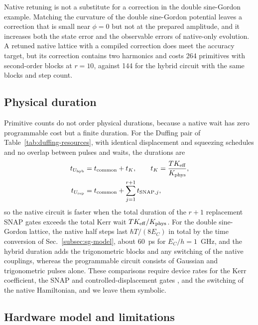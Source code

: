 \documentclass[pra,twocolumn,superscriptaddress,nofootinbib,floatfix]{revtex4-2}
\theoremstyle{remark}
\begin{document}
Native retuning is not a substitute for a correction in the double sine-Gordon example. Matching the curvature of the double sine-Gordon potential leaves a correction that is small near \(\phi=0\) but not at the prepared amplitude, and it increases both the state error and the observable errors of native-only evolution. A retuned native lattice with a compiled correction does meet the accuracy target, but its correction contains two harmonics and costs 264 primitives with second-order blocks at \(r=10\), against 144 for the hybrid circuit with the same blocks and step count.

\subsection{Physical duration}
\label{subsec:duration}

Primitive counts do not order physical durations, because a native wait has zero programmable cost but a finite duration. For the Duffing pair of Table~\ref{tab:duffing-resources}, with identical displacement and squeezing schedules and no overlap between pulses and waits, the durations are
\begin{align}
t_{U_{\rm hyb}}&=t_{\rm common}+t_K,\qquad t_K=\frac{T K_{\rm eff}}{K_{\rm phys}},\nonumber\\
t_{U_{\rm rep}}&=t_{\rm common}+\sum_{j=1}^{r+1}t_{{\rm SNAP},j},
\label{eq:break-even}
\end{align}
so the native circuit is faster when the total duration of the \(r+1\) replacement SNAP gates exceeds the total Kerr wait \(TK_{\rm eff}/K_{\rm phys}\). For the double sine-Gordon lattice, the native half steps last \(\hbar T/(8E_C)\) in total by the time conversion of Sec.~\ref{subsec:sg-model}, about 60~ps for \(E_C/h=1\)~GHz, and the hybrid duration adds the trigonometric blocks and any switching of the native couplings, whereas the programmable circuit consists of Gaussian and trigonometric pulses alone. These comparisons require device rates for the Kerr coefficient, the SNAP and controlled-displacement gates \cite{Heeres_2015,Eickbusch2022ECD}, and the switching of the native Hamiltonian, and we leave them symbolic.

\subsection{Hardware model and limitations}
\label{subsec:hardware}
\end{document}
